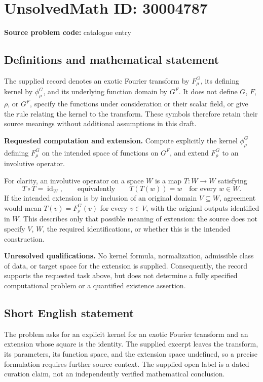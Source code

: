 \documentclass[11pt]{article}
\begin{document}
\section*{UnsolvedMath ID: 30004787}
\textbf{Source problem code:} catalogue entry
\subsection{Definitions and mathematical statement}
The supplied record denotes an exotic Fourier transform by \(F^G_\rho\), its defining kernel by \(\phi^G_\rho\), and its underlying function domain by \(G^F\). It does not define \(G\), \(F\), \(\rho\), or \(G^F\), specify the functions under consideration or their scalar field, or give the rule relating the kernel to the transform. These symbols therefore retain their source meanings without additional assumptions in this draft.

\textbf{Requested computation and extension.} Compute explicitly the kernel \(\phi^G_\rho\) defining \(F^G_\rho\) on the intended space of functions on \(G^F\), and extend \(F^G_\rho\) to an involutive operator.

For clarity, an involutive operator on a space \(W\) is a map \(T\colon W\to W\) satisfying
\[
T\circ T=\operatorname{id}_W,
\qquad\text{equivalently}\qquad
T(T(w))=w\quad\text{for every }w\in W.
\]
If the intended extension is by inclusion of an original domain \(V\subseteq W\), agreement would mean \(T(v)=F^G_\rho(v)\) for every \(v\in V\), with the original outputs identified in \(W\). This describes only that possible meaning of extension: the source does not specify \(V\), \(W\), the required identifications, or whether this is the intended construction.

\textbf{Unresolved qualifications.} No kernel formula, normalization, admissible class of data, or target space for the extension is supplied. Consequently, the record supports the requested task above, but does not determine a fully specified computational problem or a quantified existence assertion.
\subsection{Short English statement}
The problem asks for an explicit kernel for an exotic Fourier transform and an extension whose square is the identity. The supplied excerpt leaves the transform, its parameters, its function space, and the extension space undefined, so a precise formulation requires further source context. The supplied open label is a dated curation claim, not an independently verified mathematical conclusion.
\end{document}
